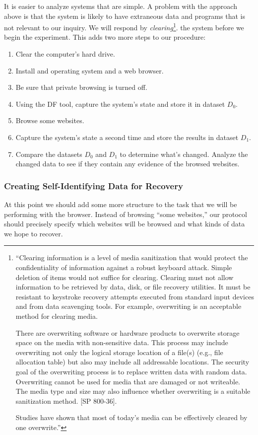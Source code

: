 It is easier to analyze systems that are simple. A problem with the
approach above is that the system is likely to have extraneous data and
programs that is not relevant to our inquiry. We will respond by
\emph{clearing}\footnote{``Clearing information is a level of media sanitization that would protect the confidentiality of information against a robust keyboard attack. Simple deletion of items would not suffice for 
clearing. Clearing must not allow information to be retrieved by data, disk, or file recovery 
utilities. It must be resistant to keystroke recovery attempts
executed from standard input devices and from data scavenging tools. For example, overwriting is an acceptable method 
for clearing media. 

There are overwriting software or hardware products to overwrite storage space on the 
media with non-sensitive data. This process may include overwriting not only the logical 
storage location of a file(s) (e.g., file allocation table) but also may include all addressable 
locations. The security goal of the overwriting process is to replace written data with 
random data. Overwriting cannot be used for media that are damaged or not writeable. 
The media type and size may also influence whether overwriting is a suitable sanitization 
method. [SP 800-36]. 

Studies have shown that most of today’s media can be effectively cleared by one overwrite.''\cite{nist-800-88}}.
the system before we begin the
experiment. This adds two more steps to our procedure:

\begin{enumerate}
\item Clear the computer's hard drive.
\item Install and operating system and a web browser.
\item Be sure that private browsing is turned off.
\item Using the DF tool, capture the system's state and store it in dataset $D_0$.
\item Browse some websites.
\item Capture the system's state a second time and store the results in dataset $D_1$.
\item Compare the datasets $D_0$ and $D_1$ to determine what's
  changed. Analyze the changed data to see if they contain any
  evidence of the browsed websites. 
\end{enumerate}


\subsubsection{Creating Self-Identifying Data for Recovery}
At this point we should add some more structure to the task that we
will be performing with the browser. Instead of browsing ``some
websites,'' our protocol should precisely specify which websites will
be browsed and what kinds of data we hope to recover. 

